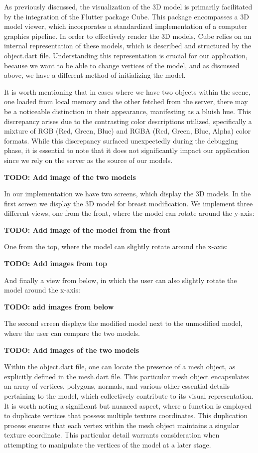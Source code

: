 As previously discussed, the visualization of the 3D model is primarily facilitated by the integration of the Flutter package Cube. 
This package encompasses a 3D model viewer, which incorporates a standardized implementation of a computer graphics pipeline. 
In order to effectively render the 3D models, Cube relies on an internal representation of these models, which is described and structured by the object.dart file.
Understanding this representation is crucial for our application, because we want to be able to change vertices of the model, and as discussed above,
we have a different method of initializing the model.

It is worth mentioning that in cases where we have two objects within the scene, one loaded from local memory and the other fetched from the server, 
there may be a noticeable distinction in their appearance, manifesting as a bluish hue. This discrepancy arises due to the contrasting color descriptions utilized, 
specifically a mixture of RGB (Red, Green, Blue) and RGBA (Red, Green, Blue, Alpha) color formats. While this discrepancy surfaced unexpectedly during 
the debugging phase, it is essential to note that it does not significantly impact our application since we rely on the server as the source of our models.

\textbf{TODO: Add image of the two models}

In our implementation we have two screens, which display the 3D models. In the first screen we display the 3D model for breast modification. We implement three different views,
one from the front, where the model can rotate around the y-axis:

\textbf{TODO: Add image of the model from the front}

One from the top, where the model can slightly rotate around the x-axis:

\textbf{TODO: Add images from top}

And finally a view from below, in which the user can also slightly rotate the model around the x-axis:

\textbf{TODO: add images from below}

The second screen displays the modified model next to the unmodified model, where the user can compare the two models.

\textbf{TODO: Add images of the two models}

Within the object.dart file, one can locate the presence of a mesh object, as explicitly defined in the mesh.dart file. This particular mesh object encapsulates an 
array of vertices, polygons, normals, and various other essential details pertaining to the model, which collectively contribute to its visual representation. 
It is worth noting a significant but nuanced aspect, where a function is employed to duplicate vertices that possess multiple texture coordinates. 
This duplication process ensures that each vertex within the mesh object maintains a singular texture coordinate. This particular detail warrants 
consideration when attempting to manipulate the vertices of the model at a later stage.

